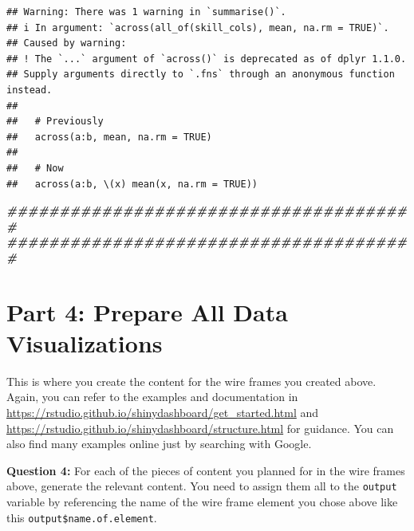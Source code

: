 \documentclass[
]{article}
\newenvironment{Shaded}{\begin{snugshade}}{\end{snugshade}}
\newcommand{\DocumentationTok}[1]{\textcolor[rgb]{0.56,0.35,0.01}{\textbf{\textit{#1}}}}
\begin{document}
\begin{verbatim}
## Warning: There was 1 warning in `summarise()`.
## i In argument: `across(all_of(skill_cols), mean, na.rm = TRUE)`.
## Caused by warning:
## ! The `...` argument of `across()` is deprecated as of dplyr 1.1.0.
## Supply arguments directly to `.fns` through an anonymous function instead.
## 
##   # Previously
##   across(a:b, mean, na.rm = TRUE)
## 
##   # Now
##   across(a:b, \(x) mean(x, na.rm = TRUE))
\end{verbatim}

\begin{Shaded}
\begin{Highlighting}[]
\DocumentationTok{\#\#\#\#\#\#\#\#\#\#\#\#\#\#\#\#\#\#\#\#\#\#\#\#\#\#\#\#\#\#\#\#\#\#\#\#\#\#\#}
\DocumentationTok{\#\#\#\#\#\#\#\#\#\#\#\#\#\#\#\#\#\#\#\#\#\#\#\#\#\#\#\#\#\#\#\#\#\#\#\#\#\#\#}
\end{Highlighting}
\end{Shaded}

\section{Part 4: Prepare All Data
Visualizations}\label{part-4-prepare-all-data-visualizations}

This is where you create the content for the wire frames you created
above. Again, you can refer to the examples and documentation in
\url{https://rstudio.github.io/shinydashboard/get_started.html} and
\url{https://rstudio.github.io/shinydashboard/structure.html} for
guidance. You can also find many examples online just by searching with
Google.

\textbf{Question 4:} For each of the pieces of content you planned for
in the wire frames above, generate the relevant content. You need to
assign them all to the \texttt{output} variable by referencing the name
of the wire frame element you chose above like this
\texttt{output\$name.of.element}.
\end{document}
